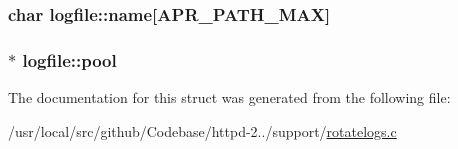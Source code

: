 \subsubsection[{\texorpdfstring{name}{name}}]{\setlength{\rightskip}{0pt plus 5cm}char logfile\+::name\mbox{[}A\+P\+R\+\_\+\+P\+A\+T\+H\+\_\+\+M\+AX\mbox{]}}\hypertarget{structlogfile_a3c8ce40a582d90edce76629eb057fd0e}{}\label{structlogfile_a3c8ce40a582d90edce76629eb057fd0e}
\subsubsection[{\texorpdfstring{pool}{pool}}]{$\ast$ logfile\+::pool}\hypertarget{structlogfile_a83746da6192e7d87efd70b5b87cca36f}{}\label{structlogfile_a83746da6192e7d87efd70b5b87cca36f}


The documentation for this struct was generated from the following file\+:\begin{DoxyCompactItemize}
\item 
/usr/local/src/github/\+Codebase/httpd-\/2../support/\hyperlink{rotatelogs_8c}{rotatelogs.\+c}\end{DoxyCompactItemize}
